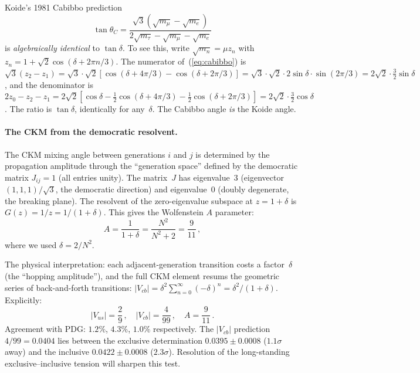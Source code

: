 \documentclass[aps,prd,twocolumn,showpacs,preprintnumbers,superscriptaddress]{revtex4-2}
\begin{document}
Koide's 1981 Cabibbo prediction~\cite{Koide:1983}
\begin{equation}
  \tan\theta_C = \frac{\sqrt{3}(\sqrt{m_\mu} - \sqrt{m_e})}
  {2\sqrt{m_\tau} - \sqrt{m_\mu} - \sqrt{m_e}}
  \label{eq:cabibbo}
\end{equation}
is \emph{algebraically identical} to $\tan\delta$.
To see this, write $\sqrt{m_n} = \mu z_n$ with
$z_n = 1 + \sqrt{2}\cos(\delta + 2\pi n/3)$.
The numerator of~(\ref{eq:cabibbo}) is
$\sqrt{3}(z_2 - z_1) = \sqrt{3}\cdot\sqrt{2}
[\cos(\delta+4\pi/3) - \cos(\delta+2\pi/3)]
= \sqrt{3}\cdot\sqrt{2}\cdot 2\sin\delta\cdot\sin(2\pi/3)
= 2\sqrt{2}\cdot\frac{3}{2}\sin\delta$,
and the denominator is
$2z_0 - z_2 - z_1 = 2\sqrt{2}[\cos\delta -
\frac{1}{2}\cos(\delta+4\pi/3) - \frac{1}{2}\cos(\delta+2\pi/3)]
= 2\sqrt{2}\cdot\frac{3}{2}\cos\delta$.
The ratio is $\tan\delta$, identically for any~$\delta$.
The Cabibbo angle \emph{is} the Koide angle.

\paragraph{The CKM from the democratic resolvent.}

The CKM mixing angle between generations $i$ and $j$ is
determined by the propagation amplitude through the
``generation space'' defined by the democratic matrix
$J_{ij} = 1$ (all entries unity).
The matrix~$J$ has eigenvalue~$3$ (eigenvector $(1,1,1)/\sqrt{3}$,
the democratic direction) and eigenvalue~$0$ (doubly degenerate,
the breaking plane).
The resolvent of the zero-eigenvalue subspace at
$z = 1 + \delta$ is $G(z) = 1/z = 1/(1+\delta)$.
This gives the Wolfenstein $A$ parameter:
\begin{equation}
  A = \frac{1}{1+\delta} = \frac{N^2}{N^2+2}
  = \frac{9}{11}\,,
  \label{eq:A}
\end{equation}
where we used $\delta = 2/N^2$.

The physical interpretation: each adjacent-generation transition
costs a factor~$\delta$ (the ``hopping amplitude''),
and the full CKM element resums the geometric series of
back-and-forth transitions:
$|V_{cb}| = \delta^2 \sum_{n=0}^\infty (-\delta)^n
= \delta^2/(1+\delta)$.
Explicitly:
\begin{equation}
  |V_{us}| = \frac{2}{9}\,,\quad
  |V_{cb}| = \frac{4}{99}\,,\quad
  A = \frac{9}{11}\,.
  \label{eq:CKM}
\end{equation}
Agreement with PDG: $1.2\%$, $4.3\%$, $1.0\%$ respectively.
The $|V_{cb}|$ prediction $4/99 = 0.0404$ lies between the
exclusive determination $0.0395 \pm 0.0008$
($1.1\sigma$ away) and the inclusive $0.0422 \pm 0.0008$
($2.3\sigma$).
Resolution of the long-standing exclusive--inclusive
tension will sharpen this test.
\end{document}
